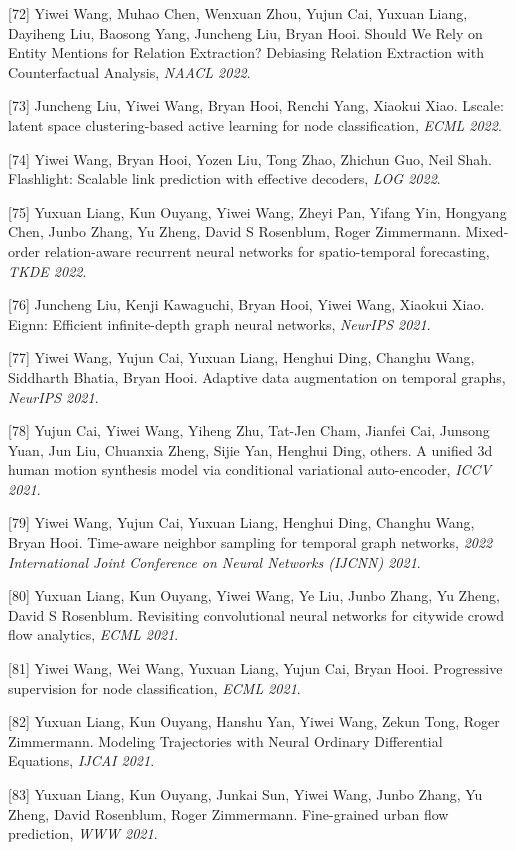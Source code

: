 [72] Yiwei Wang, Muhao Chen, Wenxuan Zhou, Yujun Cai, Yuxuan Liang, Dayiheng Liu, Baosong Yang, Juncheng Liu, Bryan Hooi. Should We Rely on Entity Mentions for Relation Extraction? Debiasing Relation Extraction with Counterfactual Analysis, \textit{NAACL 2022}.

[73] Juncheng Liu, Yiwei Wang, Bryan Hooi, Renchi Yang, Xiaokui Xiao. Lscale: latent space clustering-based active learning for node classification, \textit{ECML 2022}.

[74] Yiwei Wang, Bryan Hooi, Yozen Liu, Tong Zhao, Zhichun Guo, Neil Shah. Flashlight: Scalable link prediction with effective decoders, \textit{LOG 2022}.

[75] Yuxuan Liang, Kun Ouyang, Yiwei Wang, Zheyi Pan, Yifang Yin, Hongyang Chen, Junbo Zhang, Yu Zheng, David S Rosenblum, Roger Zimmermann. Mixed-order relation-aware recurrent neural networks for spatio-temporal forecasting, \textit{TKDE 2022}.

[76] Juncheng Liu, Kenji Kawaguchi, Bryan Hooi, Yiwei Wang, Xiaokui Xiao. Eignn: Efficient infinite-depth graph neural networks, \textit{NeurIPS 2021}.

[77] Yiwei Wang, Yujun Cai, Yuxuan Liang, Henghui Ding, Changhu Wang, Siddharth Bhatia, Bryan Hooi. Adaptive data augmentation on temporal graphs, \textit{NeurIPS 2021}.

[78] Yujun Cai, Yiwei Wang, Yiheng Zhu, Tat-Jen Cham, Jianfei Cai, Junsong Yuan, Jun Liu, Chuanxia Zheng, Sijie Yan, Henghui Ding, others. A unified 3d human motion synthesis model via conditional variational auto-encoder, \textit{ICCV 2021}.

[79] Yiwei Wang, Yujun Cai, Yuxuan Liang, Henghui Ding, Changhu Wang, Bryan Hooi. Time-aware neighbor sampling for temporal graph networks, \textit{2022 International Joint Conference on Neural Networks (IJCNN) 2021}.

[80] Yuxuan Liang, Kun Ouyang, Yiwei Wang, Ye Liu, Junbo Zhang, Yu Zheng, David S Rosenblum. Revisiting convolutional neural networks for citywide crowd flow analytics, \textit{ECML 2021}.

[81] Yiwei Wang, Wei Wang, Yuxuan Liang, Yujun Cai, Bryan Hooi. Progressive supervision for node classification, \textit{ECML 2021}.

[82] Yuxuan Liang, Kun Ouyang, Hanshu Yan, Yiwei Wang, Zekun Tong, Roger Zimmermann. Modeling Trajectories with Neural Ordinary Differential Equations, \textit{IJCAI 2021}.

[83] Yuxuan Liang, Kun Ouyang, Junkai Sun, Yiwei Wang, Junbo Zhang, Yu Zheng, David Rosenblum, Roger Zimmermann. Fine-grained urban flow prediction, \textit{WWW 2021}.

